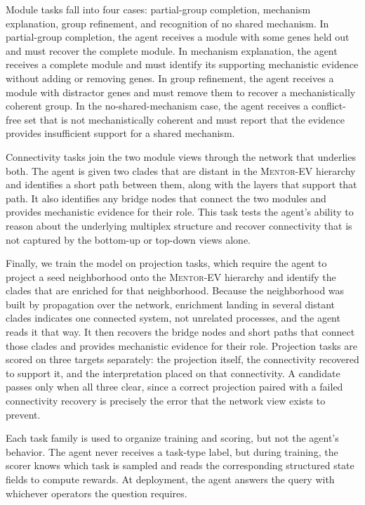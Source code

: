 Module tasks fall into four cases: partial-group completion, mechanism explanation, group refinement, and recognition of no shared mechanism. In partial-group completion, the agent receives a module with some genes held out and must recover the complete module. In mechanism explanation, the agent receives a complete module and must identify its supporting mechanistic evidence without adding or removing genes. In group refinement, the agent receives a module with distractor genes and must remove them to recover a mechanistically coherent group. In the no-shared-mechanism case, the agent receives a conflict-free set that is not mechanistically coherent and must report that the evidence provides insufficient support for a shared mechanism.

Connectivity tasks join the two module views through the network that underlies both. The agent is given two clades that are distant in the \textsc{Mentor-EV} hierarchy and identifies a short path between them, along with the layers that support that path. It also identifies any bridge nodes that connect the two modules and provides mechanistic evidence for their role. This task tests the agent's ability to reason about the underlying multiplex structure and recover connectivity that is not captured by the bottom-up or top-down views alone.

Finally, we train the model on projection tasks, which require the agent to project a seed neighborhood onto the \textsc{Mentor-EV} hierarchy and identify the clades that are enriched for that neighborhood. Because the neighborhood was built by propagation over the network, enrichment landing in several distant clades indicates one connected system, not unrelated processes, and the agent reads it that way. It then recovers the bridge nodes and short paths that connect those clades and provides mechanistic evidence for their role. Projection tasks are scored on three targets separately: the projection itself, the connectivity recovered to support it, and the interpretation placed on that connectivity. A candidate passes only when all three clear, since a correct projection paired with a failed connectivity recovery is precisely the error that the network view exists to prevent.

Each task family is used to organize training and scoring, but not the agent's behavior. The agent never receives a task-type label, but during training, the scorer knows which task is sampled and reads the corresponding structured state fields to compute rewards. At deployment, the agent answers the query with whichever operators the question requires.

